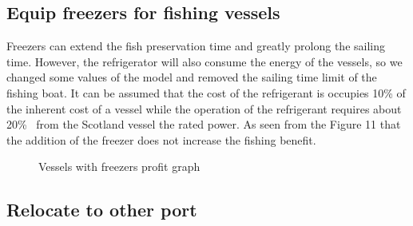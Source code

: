 \documentclass{mcmthesis}
\begin{document}
\subsection{Equip freezers for fishing vessels}
Freezers can extend the fish preservation time and greatly prolong the sailing time. However, the refrigerator will also consume the energy of the vessels, so we changed some values of the model and removed the sailing time limit of the fishing boat. It can be assumed that the cost of the refrigerant is occupies 10\% of the inherent cost of a vessel while the operation of the refrigerant requires about 20\%  from the Scotland vessel the rated power. As seen from the Figure 11 that the addition of the freezer does not increase the fishing benefit.

\begin{figure}[htbp]
  \centering
  \centering
  \caption{Vessels with freezers profit graph}
\end{figure}

\subsection{Relocate to other port}
\end{document}
